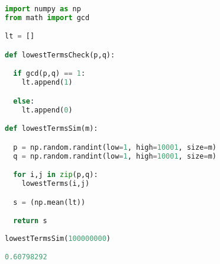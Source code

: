 \documentclass{article}
\begin{document}
\begin{lstlisting}[language=Python, caption = Solution technique 2 is more efficient and generates only one sample]
import numpy as np
from math import gcd

lt = []

def lowestTermsCheck(p,q):

  if gcd(p,q) == 1:
    lt.append(1)

  else:
    lt.append(0)

def lowestTermsSim(m):

  p = np.random.randint(low=1, high=10001, size=m)
  q = np.random.randint(low=1, high=10001, size=m)

  for i,j in zip(p,q):
    lowestTerms(i,j)

  s = (np.mean(lt))

  return s
  
lowestTermsSim(100000000)

0.60798292

\end{lstlisting}
\end{document}
